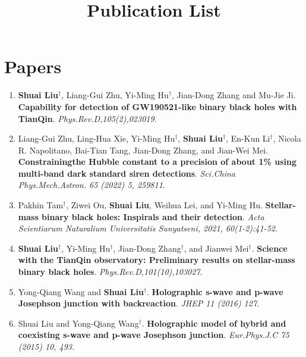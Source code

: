 \documentclass[12pt,a4paper,sans]{article}%
\title{\vspace{-2.5cm}\Huge Publication List \vspace{-2.2em}}
\date{}
\begin{document}
\maketitle
\section*{Papers}
\begin{enumerate}[1.]
    \item \textbf{Shuai Liu}$^{\dagger}$, Liang-Gui Zhu, Yi-Ming Hu$^{\dagger}$, Jian-Dong Zhang and Mu-Jie Ji.
     \textbf{Capability for detection of GW190521-like binary black holes with TianQin}.
        \emph{Phys.Rev.D,105(2),023019}.
    \item Liang-Gui Zhu, Ling-Hua Xie, Yi-Ming Hu$^{\dagger}$, \textbf{Shuai Liu}$^{\dagger}$, En-Kun Li$^{\dagger}$,
        Nicola R. Napolitano, Bai-Tian Tang, Jian-Dong Zhang, and Jian-Wei Mei. \textbf{Constrainingthe Hubble constant
        to a precision of about 1\% using multi-band dark standard siren detections}. \emph{Sci.China Phys.Mech.Astron.
        65 (2022) 5, 259811}.
    \item Pakhin Tam$^{\dagger}$, Ziwei Ou, \textbf{Shuai Liu}, Weihua Lei, and Yi-Ming Hu. \textbf{Stellar-mass binary
        black holes: Inspirals and their detection}. \emph{Acta Scientiarum Naturalium Universitatis Sunyatseni, 2021, 60(1-2):41-52}.
    \item \textbf{Shuai Liu}$^{\dagger}$, Yi-Ming Hu$^{\dagger}$, Jian-Dong Zhang$^{\dagger}$, and Jianwei
        Mei$^{\dagger}$. \textbf{Science with the TianQin observatory: Preliminary results on stellar-mass binary black
        holes}. \emph{Phys.Rev.D,101(10),103027}.
    \item Yong-Qiang Wang and \textbf{Shuai Liu}$^{\dagger}$. \textbf{Holographic s-wave and p-wave Josephson junction
        with backreaction}. \emph{JHEP 11 (2016) 127}.
    \item Shuai Liu and Yong-Qiang Wang$^{\dagger}$. \textbf{Holographic model of hybrid and coexisting s-wave and
        p-wave Josephson junction}. \emph{Eur.Phys.J.C 75 (2015) 10, 493}.
\end{enumerate}
\end{document}

